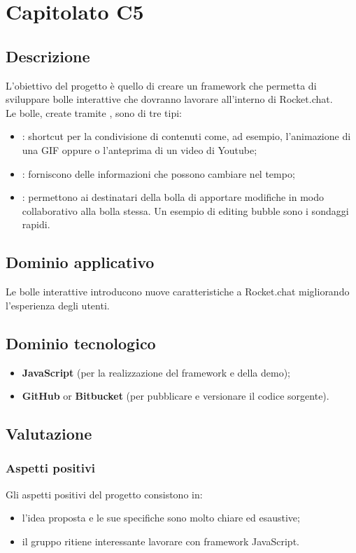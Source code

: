 \section {Capitolato C5}
	\subsection {Descrizione}
		L'obiettivo del progetto è quello di creare un framework che permetta di sviluppare bolle interattive che dovranno lavorare all'interno di Rocket.chat. \\
		Le bolle, create tramite , sono di tre tipi:
		\begin{itemize}
			\item {}: shortcut per la condivisione di contenuti come, ad esempio, l'animazione di una GIF oppure o l'anteprima di un video di Youtube;
			\item {}: forniscono delle informazioni che possono cambiare nel tempo;
			\item {}: permettono ai destinatari della bolla di apportare modifiche in modo collaborativo alla bolla stessa. Un esempio di editing bubble sono i sondaggi rapidi.
		\end{itemize}
	\subsection {Dominio applicativo}
		Le bolle interattive introducono nuove caratteristiche a Rocket.chat migliorando l'esperienza degli utenti.
	\subsection {Dominio tecnologico}
		\begin{itemize}
		\item \textbf{JavaScript} (per la realizzazione del framework e della demo);
		\item \textbf{GitHub} or \textbf{Bitbucket} (per pubblicare e versionare il codice sorgente).
		\end{itemize}
	\subsection {Valutazione}
		\subsubsection {Aspetti positivi}
		Gli aspetti positivi del progetto consistono in:
			\begin{itemize}
				\item l’idea proposta e le sue specifiche sono molto chiare ed esaustive;
				\item il gruppo ritiene interessante lavorare con framework JavaScript.
			\end{itemize}
